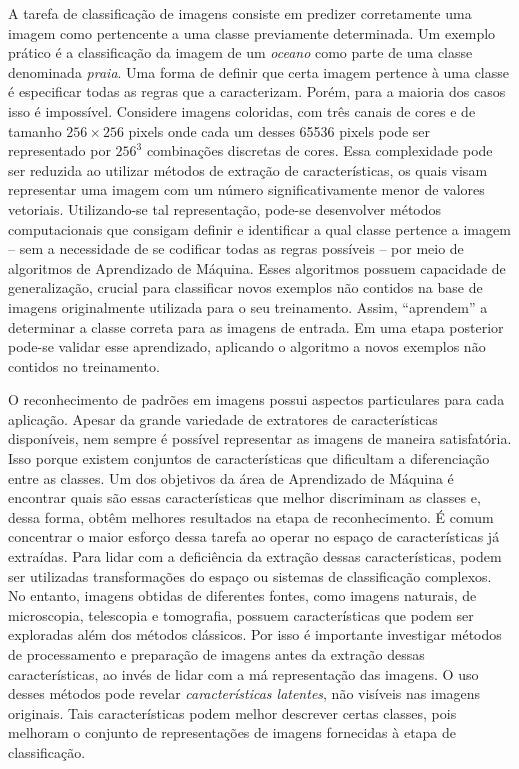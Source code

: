 
A tarefa de classificação de imagens consiste em predizer corretamente uma imagem como pertencente a uma classe previamente determinada. Um exemplo prático é a classificação da imagem de um \textit{oceano} como parte de uma classe denominada \textit{praia}. Uma forma de definir que certa imagem pertence à uma classe é especificar todas as regras que a caracterizam.
Porém, para a maioria dos casos isso é impossível. Considere imagens coloridas, com três canais de cores e de tamanho $256\times256$ pixels onde cada um desses 65536 pixels pode ser representado por $256^3$ combinações discretas de cores. Essa complexidade pode ser reduzida ao utilizar métodos de extração de características, os quais visam representar uma imagem com um número significativamente menor de valores vetoriais. Utilizando-se tal representação, pode-se desenvolver métodos computacionais que consigam definir e identificar a qual classe pertence a imagem -- sem a necessidade de se codificar todas as regras possíveis -- por meio de algoritmos de Aprendizado de Máquina. Esses algoritmos possuem capacidade de generalização, crucial para classificar novos exemplos não contidos na base de imagens originalmente utilizada para o seu treinamento. Assim, ``aprendem'' a determinar a classe correta para as imagens de entrada. Em uma etapa posterior pode-se validar esse aprendizado, aplicando o algoritmo a novos exemplos não contidos no treinamento.

O reconhecimento de padrões em imagens possui aspectos particulares para cada aplicação. Apesar da grande variedade de extratores de características disponíveis, nem sempre é possível representar as imagens de maneira satisfatória. Isso porque existem conjuntos de características que dificultam a diferenciação entre as classes. Um dos objetivos da área de Aprendizado de Máquina é encontrar quais são essas características que melhor discriminam as classes e, dessa forma, obtêm melhores resultados na etapa de reconhecimento. É comum concentrar o maior esforço dessa tarefa ao operar no espaço de características já extraídas. Para lidar com a deficiência da extração dessas características, podem ser utilizadas transformações do espaço ou sistemas de classificação complexos. No entanto, imagens obtidas de diferentes fontes, como imagens naturais, de microscopia, telescopia e tomografia, possuem características que podem ser exploradas além dos métodos clássicos. Por isso é importante investigar métodos de processamento e preparação de imagens antes da extração dessas características, ao invés de lidar com a má representação das imagens. O uso desses métodos pode revelar \textit{características latentes}, não visíveis nas imagens originais. Tais características podem melhor descrever certas classes, pois melhoram o conjunto de representações de imagens fornecidas à etapa de classificação.

